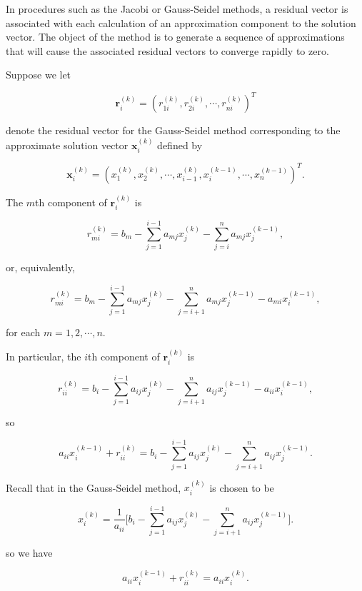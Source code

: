 \documentclass[preprint,12pt]{elsarticle}
\begin{document}
In procedures such as the Jacobi or Gauss-Seidel methods, a residual vector is associated with each calculation of an approximation component to the solution vector. The object of the method is to generate a sequence of approximations that will cause the associated residual vectors to converge rapidly to zero.

Suppose we let

\[
\mathbf{r}_i^{(k)} = (r^{(k)}_{1i},r^{(k)}_{2i},\cdots,r^{(k)}_{ni})^T
\]

denote the residual vector for the Gauss-Seidel method corresponding to the approximate solution vector $\mathbf{x}_i^{(k)}$ defined by

\[
\mathbf{x}_{i}^{(k)} =
(x^{(k)}_{1},x^{(k)}_{2},\cdots,x_{i-1}^{(k)},x_i^{(k-1)},\cdots,x^{(k-1)}_{n})^T.
\]

The $m$th component of $\mathbf{r}^{(k)}_i$ is

\begin{equation*}
    r_{mi}^{(k)}=b_m-\sum_{j=1}^{i-1}a_{mj}x_j^{(k)}-\sum_{j=i}^n
    a_{mj}x_j^{(k-1)},
\end{equation*}

or, equivalently,

\begin{equation*}
    r_{mi}^{(k)}=b_m-\sum_{j=1}^{i-1}a_{mj}x_j^{(k)}-\sum_{j=i+1}^n
    a_{mj}x_j^{(k-1)}-a_{mi}x_i^{(k-1)},
\end{equation*}

for each $m =1,2,\cdots,n$.

In particular, the $i$th component of $\mathbf{r}_{i}^{(k)}$ is

\begin{equation*}
    r_{ii}^{(k)}=b_i-\sum_{j=1}^{i-1}a_{ij}x_j^{(k)}-\sum_{j=i+1}^n
    a_{ij}x_j^{(k-1)}-a_{ii}x_i^{(k-1)},
\end{equation*}

so

\begin{equation*}
    a_{ii}x_i^{(k-1)}+r_{ii}^{(k)}=b_i-\sum_{j=1}^{i-1}a_{ij}x_j^{(k)}
    -\sum_{j=i+1}^n a_{ij}x_j^{(k-1)}.
\end{equation*}

Recall that in the Gauss-Seidel method, $x_i^{(k)}$ is chosen to be

\[
x_i^{(k)}=\frac{1}{a_{ii}}\biggl[b_i-\sum_{j=1}^{i-1}a_{ij}x_j^{(k)}
-\sum_{j=i+1}^{n}a_{ij}x_j^{(k-1)}\biggr].
\]

so we have

\begin{equation*}
a_{ii}x_i^{(k-1)}+r_{ii}^{(k)}=a_{ii}x_i^{(k)}.
\end{equation*}
\end{document}
